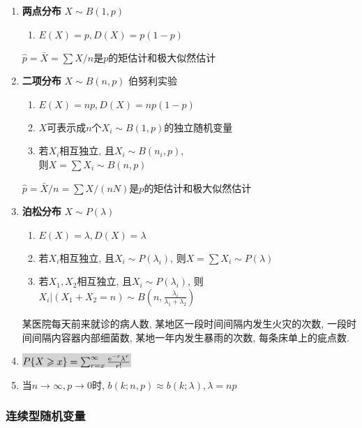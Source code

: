 \begin{enumerate}
\item {\bf 两点分布} $X\sim B(1,p)$\\
\begin{enumerate}[label={\sf 性质\arabic*}]
\item $E(X)=p, D(X)=p(1-p)$
\end{enumerate}
$\hat{p}=\bar{X}={\sum{X}}/{n}$是$p$的矩估计和极大似然估计

\item {\bf 二项分布} $X\sim B(n,p)$ 伯努利实验\\
\begin{enumerate}[label={\sf 性质\arabic*}]
\item $E(X)=np, D(X)=np(1-p)$
\item $X$可表示成$n$个$X_i\sim B(1,p)$的独立随机变量
\item 若$X_i$相互独立, 且$X_i\sim B(n_i,p)$, \\则$X=\sum X_i\sim B(n,p)$
\end{enumerate}
$\hat{p}={\bar{X}}/{n}={\sum{X}}/{(nN)}$是$p$的矩估计和极大似然估计

\item {\bf 泊松分布} $X\sim P(\lambda)$\\
\begin{enumerate}[label={\sf 性质\arabic*}]
\item $E(X)=\lambda, D(X)=\lambda$
\item 若$X_i$相互独立, 且$X_i\sim P(\lambda_i)$, 则$X=\sum X_i\sim P(\lambda)$
\item 若$X_1, X_2$相互独立, 且$X_i\sim P(\lambda_i)$, 则$X_i|(X_1+X_2=n)\sim B(n, \frac{\lambda_i}{\lambda_1+\lambda_2})$
\end{enumerate}
某医院每天前来就诊的病人数, 某地区一段时间间隔内发生火灾的次数, 一段时间间隔内容器内部细菌数, 某地一年内发生暴雨的次数, 每条床单上的疵点数.
\item \colorbox{lightgray}{$P\{X\geqslant x\}=\sum_{r=x}^{\infty}\frac{{\mathrm{e}}^{-r}\lambda^r}{r!}$}

\item 当$n\to\infty, p\to0$时, $b(k;n,p)\approx b(k;\lambda), \lambda=np$

\end{enumerate}

\subsubsection*{连续型随机变量}

